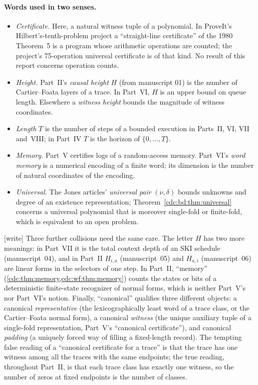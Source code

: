 \documentclass[11pt,a4paper]{article}
\theoremstyle{definition}
\theoremstyle{remark}
\newcommand{\wtag}{\textup{[write]}}%
\begin{document}
\paragraph{Words used in two senses.}
\begin{itemize}
\item \emph{Certificate.} Here, a natural witness tuple of a polynomial. In
ProveIt's Hilbert's-tenth-problem project a ``straight-line certificate'' of
the 1980 Theorem~5 is a program whose arithmetic operations are counted; the
project's 75-operation universal certificate is of that kind. No result of
this report concerns operation counts.
\item \emph{Height.} Part~II's \emph{causal height} $H$ (from manuscript 01)
is the number of Cartier--Foata layers of a trace. In Part~VI, $H$ is an
upper bound on queue length. Elsewhere a \emph{witness height} bounds the
magnitude of witness coordinates.
\item \emph{Length} $T$ is the number of steps of a bounded execution in
Parts~II, VI, VII and~VIII; in Part~IV $T$ is the horizon of $\{0,\ldots,T\}$.
\item \emph{Memory.} Part~V certifies logs of a random-access memory.
Part~VI's \emph{word memory} is a numerical encoding of a finite word; its
dimension is the number of natural coordinates of the encoding.
\item \emph{Universal.} The Jones articles' \emph{universal pair}
$(\nu,\delta)$ bounds unknowns and degree of an existence representation;
Theorem~\ref{cdc:bd:thm:universal} concerns a universal polynomial that is
moreover single-fold or finite-fold, which is equivalent to an open problem.
\end{itemize}
\wtag{} Three further collisions need the same care. The letter $H$ has two more meanings: in Part~VII it is the total context depth of an SKI schedule (manuscript~04), and in Part~II $H_{i,a}$ (manuscript~05) and $H_{a,i}$ (manuscript~06) are linear forms in the selectors of one step. In Part~II, ``memory'' (\cref{cdc:thm:memory,cdc:wf:thm:memory}) counts the states or bits of a deterministic finite-state recognizer of normal forms, which is neither Part~V's nor Part~VI's notion. Finally, ``canonical'' qualifies three different objects: a canonical \emph{representative} (the lexicographically least word of a trace class, or the Cartier--Foata normal form), a canonical \emph{witness} (the unique auxiliary tuple of a single-fold representation, Part~V's ``canonical certificate''), and canonical \emph{padding} (a uniquely forced way of filling a fixed-length record). The tempting false reading of a ``canonical certificate for a trace'' is that the trace has one witness among all the traces with the same endpoints; the true reading, throughout Part~II, is that each trace class has exactly one witness, so the number of zeros at fixed endpoints is the number of classes.
\end{document}

